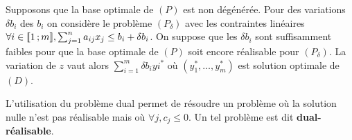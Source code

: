 \begin{thm}
	Supposons que la base optimale de $(P)$ est non dégénérée.
	Pour des variations $\delta b_i$ des $b_i$ on considère le problème $(P_\delta)$ avec les contraintes linéaires $\forall i \in \mathopen{[\![}1\mathclose{}\mathpunct{};m\mathclose{]\!]}, \sum_{j = 1}^n a_{ij} x_j \leq b_i + \delta b_i$.
	On suppose que les $\delta b_i$ sont suffisamment faibles pour que la base optimale de $(P)$ soit encore réalisable pour $(P_\delta)$.
	La variation de $z$ vaut alors $\sum_{i = 1}^m \delta b_i yi^*$ où $(y_1^*, \ldots, y_m^*)$ est solution optimale de $(D)$.
\end{thm}

L'utilisation du problème dual permet de résoudre un problème où la solution nulle n'est pas réalisable mais où $\forall j, c_j \leq 0$.
Un tel problème est dit \textbf{dual-réalisable}.
